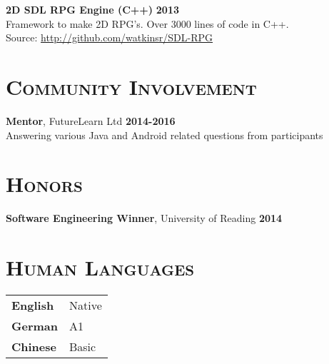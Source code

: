 \documentclass[line, margin, 10pt]{res}
\begin{document}
\begin{resume}
{\bf 2D SDL RPG Engine (C++)} {\bf \hfill 2013}\\
Framework to make 2D RPG's. Over 3000 lines of code in C++.  \\
Source: \url{http://github.com/watkinsr/SDL-RPG}


\section{\textsc{Community Involvement}}

{\bf Mentor}, FutureLearn Ltd {\bf \hfill 2014-2016}\\
Answering various Java and Android related questions from participants

\section{\textsc{Honors}}

{\bf Software Engineering Winner}, University of Reading {\bf \hfill 2014}\\

\section{\textsc{Human Languages}}

\begin{tabular}[t]{@{} p{1.2in} p{3.75in} @{}}

\textbf{English} & Native\\ 
\textbf{German} & A1 \\
\textbf{Chinese} & Basic

\end{tabular}

\end{resume}
\end{document}
